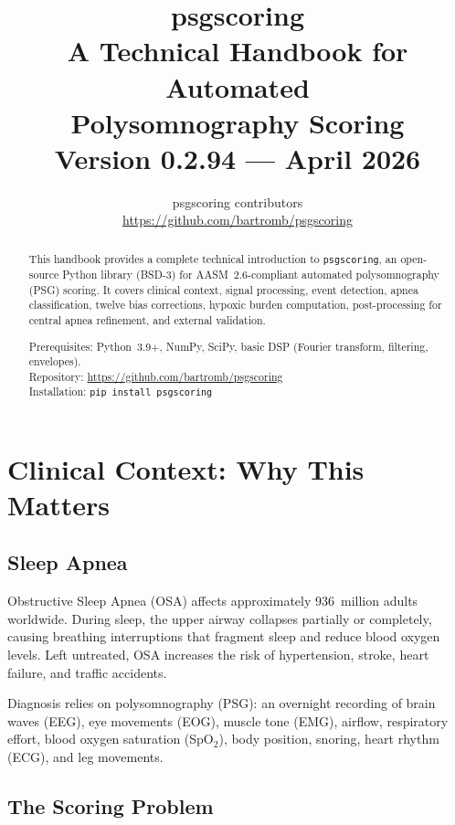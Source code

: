 \documentclass[11pt,a4paper]{article}
\title{\textbf{\LARGE psgscoring}\\[8pt]
\large A Technical Handbook for Automated\\
Polysomnography Scoring\\[8pt]
\normalsize Version 0.2.94 --- April 2026}
\author{psgscoring contributors\\
\url{https://github.com/bartromb/psgscoring}}
\date{}
\begin{document}
\maketitle
\thispagestyle{empty}

\begin{abstract}
\noindent
This handbook provides a complete technical introduction to
\texttt{psgscoring}, an open-source Python library (BSD-3) for
AASM~2.6-compliant automated polysomnography (PSG) scoring. It covers
clinical context, signal processing, event detection, apnea
classification, twelve bias corrections, hypoxic burden computation,
post-processing for central apnea refinement, and external validation.

\medskip\noindent
Prerequisites: Python~3.9+, NumPy, SciPy, basic DSP
(Fourier transform, filtering, envelopes).\\
Repository: \url{https://github.com/bartromb/psgscoring}\\
Installation: \texttt{pip install psgscoring}
\end{abstract}

\tableofcontents
\newpage

\section{Clinical Context: Why This Matters}

\subsection{Sleep Apnea}

Obstructive Sleep Apnea (OSA) affects approximately 936~million adults
worldwide. During sleep, the upper airway collapses partially or
completely, causing breathing interruptions that fragment sleep and
reduce blood oxygen levels. Left untreated, OSA increases the risk of
hypertension, stroke, heart failure, and traffic accidents.

Diagnosis relies on polysomnography (PSG): an overnight recording of
brain waves (EEG), eye movements (EOG), muscle tone (EMG), airflow,
respiratory effort, blood oxygen saturation (SpO$_2$), body position,
snoring, heart rhythm (ECG), and leg movements.

\subsection{The Scoring Problem}
\end{document}
